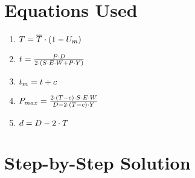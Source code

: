\documentclass[11pt,a4paper]{article}
\begin{document}
\section{Equations Used}

\begin{enumerate}
\item $\Large T = \overline{T}  \cdot  (1  - U_m)$
\item $\Large t = \frac{P  \cdot  D}{2   \cdot  (S  \cdot  E  \cdot  W + P  \cdot  Y)}$
\item $\Large t_{m} = t + c$
\item $\Large P_{max} = \frac{2   \cdot  (T - c)  \cdot  S  \cdot  E  \cdot  W}{D - 2   \cdot  (T - c)  \cdot  Y}$
\item $\Large d = D - 2   \cdot  T$
\end{enumerate}

\section{Step-by-Step Solution}
\end{document}
